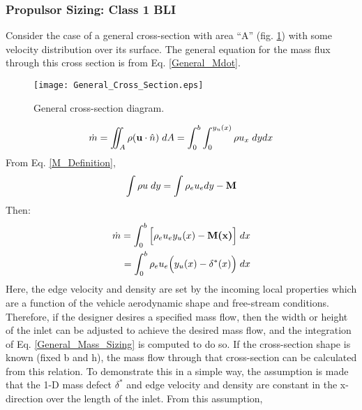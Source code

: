 				\subsubsection{Propulsor Sizing:  Class 1 BLI}	
					Consider the case of a general cross-section with area ``A'' (fig. \ref{General_Cross_Section}) with some velocity distribution over its surface.  The general equation for the mass flux through this cross section is from Eq. \ref{General_Mdot}.
					\begin{figure}[htp]
						\centering
						\vspace{0mm}
						\texttt{[image: General\_Cross\_Section.eps]}
						\caption{General cross-section diagram.}
						\label{General_Cross_Section}
					\end{figure}					
					\begin{equation}
						\dot{m} = \iint_A \rho (\textbf{u} \cdot \hat{n}) \hspace{1mm} dA = \int_{0}^{b}\int_{0}^{y_u(x)} \rho u_x \hspace{1mm} dy dx
						\label{General_Mdot}
					\end{equation}	
					From Eq. \ref{M_Definition}, 
					\begin{equation}
						\int \rho u \hspace{1mm} dy = \int \rho_e u_e dy - \textbf{M}
					\end{equation}					
					Then:
					\begin{equation}
						\begin{aligned}
							\dot{m} = \int_0^b \Big[\rho_e u_e y_u(x) - \textbf{M(x)}\Big] \hspace{1mm} dx \\
									= \int_0^b \rho_e u_e \Big(y_u(x) - \delta^*(x)\Big) \hspace{1mm} dx
						\end{aligned}
						\label{General_Mass_Sizing}
					\end{equation}
					Here, the edge velocity and density are set by the incoming local properties which are a function of the vehicle aerodynamic shape and free-stream conditions.  Therefore, if the designer desires a specified mass flow, then the width or height of the inlet can be adjusted to achieve the desired mass flow, and the integration of Eq. \ref{General_Mass_Sizing} is computed to do so.  If the cross-section shape is known (fixed b and h), the mass flow through that cross-section can be calculated from this relation.  To demonstrate this in a simple way, the assumption is made that the 1-D mass defect $\delta^*$ and edge velocity and density are constant in the x-direction over the length of the inlet.  From this assumption, 					
